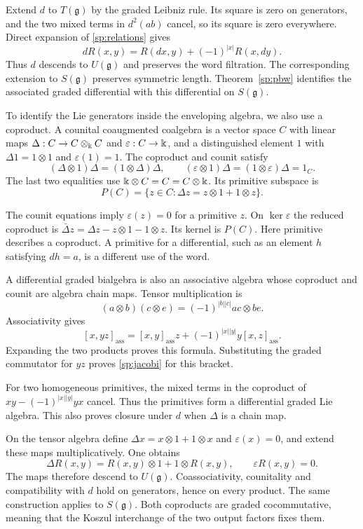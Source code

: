 Extend $d$ to $T(\mathfrak g)$ by the graded Leibniz rule.
Its square is zero on generators, and the two mixed terms in $d^2(ab)$
cancel, so its square is zero everywhere.
Direct expansion of \eqref{sp:relations} gives
\[
 dR(x,y)=R(dx,y)+(-1)^{|x|}R(x,dy).
\]
Thus $d$ descends to $U(\mathfrak g)$ and preserves the word filtration.
The corresponding extension to $S(\mathfrak g)$ preserves symmetric
length.  Theorem~\ref{sp:pbw} identifies the associated graded
differential with this differential on $S(\mathfrak g)$.

To identify the Lie generators inside the enveloping algebra, we
also use a coproduct. A counital coaugmented coalgebra is a vector
space $C$ with linear maps $\Delta:C\to C\otimes_\Bbbk C$ and
$\varepsilon:C\to \Bbbk$, and a distinguished element $1$ with
$\Delta1=1\otimes1$ and $\varepsilon(1)=1$.
The coproduct and counit satisfy
\[
 (\Delta\otimes1)\Delta=(1\otimes\Delta)\Delta,\qquad
 (\varepsilon\otimes1)\Delta=(1\otimes\varepsilon)\Delta=1_C.
\]
The last two equalities use $\Bbbk\otimes C=C=C\otimes \Bbbk$.
Its primitive subspace is
\[
 P(C)=\{z\in C:\Delta z=z\otimes1+1\otimes z\}.
\]

The counit equations imply $\varepsilon(z)=0$ for a primitive $z$.
On $\ker\varepsilon$ the reduced coproduct is
$\bar\Delta z=\Delta z-z\otimes1-1\otimes z$. Its kernel is $P(C)$.
Here primitive describes a coproduct. A primitive for a differential,
such as an element $h$ satisfying $dh=a$, is a different use of the word.

A differential graded bialgebra is also an associative algebra whose
coproduct and counit are algebra chain maps.  Tensor multiplication is
\[
 (a\otimes b)(c\otimes e)=(-1)^{|b||c|}ac\otimes be.
\]
Associativity gives
\[
 [x,yz]_{\mathrm{ass}}=[x,y]_{\mathrm{ass}}z
       +(-1)^{|x||y|}y[x,z]_{\mathrm{ass}}.
\]
Expanding the two products proves this formula.  Substituting the
graded commutator for $yz$ proves \eqref{sp:jacobi} for this bracket.

For two homogeneous primitives, the mixed terms in the coproduct of
$xy-(-1)^{|x||y|}yx$ cancel.  Thus the primitives form a differential
graded Lie algebra.  This also proves closure under $d$ when $\Delta$
is a chain map.

On the tensor algebra define $\Delta x=x\otimes1+1\otimes x$ and
$\varepsilon(x)=0$, and extend these maps multiplicatively.
One obtains
\[
 \Delta R(x,y)=R(x,y)\otimes1+1\otimes R(x,y),
 \qquad \varepsilon R(x,y)=0.
\]
The maps therefore descend to $U(\mathfrak g)$.
Coassociativity, counitality and compatibility with $d$ hold on
generators, hence on every product.  The same construction applies to
$S(\mathfrak g)$.  Both coproducts are graded cocommutative, meaning
that the Koszul interchange of the two output factors fixes them.

